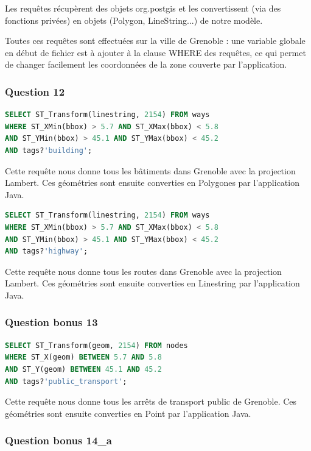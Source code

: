 \documentclass[12pt,a4paper]{article}
\begin{document}
Les requêtes récupèrent des objets org.postgis et les convertissent (via des fonctions privées) en objets (Polygon, LineString...) de notre modèle.

Toutes ces requêtes sont effectuées sur la ville de Grenoble : une variable globale en début de fichier est à ajouter à la clause WHERE des requêtes, ce qui permet de changer facilement les coordonnées de la zone couverte par l'application.

\subsubsection*{Question 12}

\begin{lstlisting}[language=SQL]
SELECT ST_Transform(linestring, 2154) FROM ways
WHERE ST_XMin(bbox) > 5.7 AND ST_XMax(bbox) < 5.8
AND ST_YMin(bbox) > 45.1 AND ST_YMax(bbox) < 45.2
AND tags?'building';
\end{lstlisting}

Cette requête nous donne tous les bâtiments dans Grenoble avec la projection Lambert. Ces géométries sont ensuite converties en Polygones par l'application Java.

\begin{lstlisting}[language=SQL]
SELECT ST_Transform(linestring, 2154) FROM ways
WHERE ST_XMin(bbox) > 5.7 AND ST_XMax(bbox) < 5.8
AND ST_YMin(bbox) > 45.1 AND ST_YMax(bbox) < 45.2
AND tags?'highway';
\end{lstlisting}

Cette requête nous donne tous les routes dans Grenoble avec la projection Lambert. Ces géométries sont ensuite converties en Linestring par l'application Java.

\subsubsection*{Question bonus 13}

\begin{lstlisting}[language=SQL]
SELECT ST_Transform(geom, 2154) FROM nodes
WHERE ST_X(geom) BETWEEN 5.7 AND 5.8
AND ST_Y(geom) BETWEEN 45.1 AND 45.2
AND tags?'public_transport';
\end{lstlisting}

Cette requête nous donne tous les arrêts de transport public de Grenoble. Ces géométries sont ensuite converties en Point par l'application Java.

\subsubsection*{Question bonus 14\_a}
\end{document}
